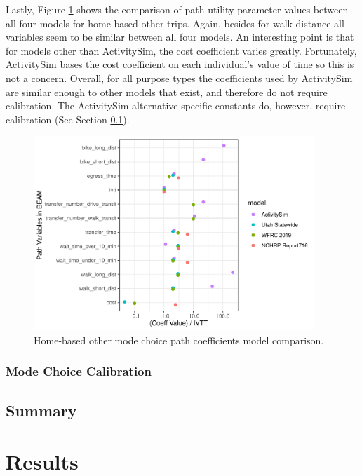 \documentclass[12pt, oneside, openright]{byuthesis}
\begin{document}
Lastly, Figure \ref{fig:hbo} shows the comparison of path utility parameter values between all four models for home-based other trips. Again, besides for walk distance all variables seem to be similar between all four models. An interesting point is that for models other than ActivitySim, the cost coefficient varies greatly. Fortunately, ActivitySim bases the cost coefficient on each individual's value of time so this is not a concern. Overall, for all purpose types the coefficients used by ActivitySim are similar enough to other models that exist, and therefore do not require calibration. The ActivitySim alternative specific constants do, however, require calibration (See Section \ref{clib}).

\begin{figure}

{\centering \includegraphics[width=400px]{thesis_files/figure-latex/hbo-1} 

}

\caption{Home-based other mode choice path coefficients model comparison.}\label{fig:hbo}
\end{figure}

\hypertarget{clib}{%
\subsection{Mode Choice Calibration}\label{clib}}

\hypertarget{summary}{%
\section{Summary}\label{summary}}

\hypertarget{results}{%
\chapter{Results}\label{results}}
\end{document}
